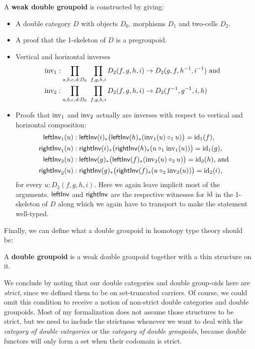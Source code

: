 \begin{defn}
A \textbf{weak double groupoid} is constructed by giving:
\begin{itemize}
\item A double category $D$ with objects $D_0$, morphisms $D_1$ and two-cells $D_2$.
\item A proof that the 1-skeleton of $D$ is a pregroupoid.
\item Vertical and horizontal inverses
\begin{align*}
\operatorname{inv_1} &: \prod_{a,b,c,d:D_0} ~ \prod_{f,g,h,i}
	D_2(f,g,h,i) \to D_2(g,f,h^{-1},i^{-1}) \text{ and } \\
\operatorname{inv_2} &: \prod_{a,b,c,d:D_0} ~ \prod_{f,g,h,i}
	D_2(f,g,h,i) \to D_2(f^{-1},g^{-1},i,h)
\end{align*}
\item Proofs that $\operatorname{inv_1}$ and $\operatorname{inv_2}$ actually are inverses with respect to
vertical and horizontal composition:
\begin{align*}
\mathsf{leftInv}_1(u) &: \mathsf{leftInv}(i)_*\big(\mathsf{leftInv}(h)_*(\operatorname{inv_1}(u) \circ_1 u)\big) =
	\operatorname{id}_1(f) \text{,} \\
\mathsf{rightInv}_1(u) &: \mathsf{rightInv}(i)_*\big(\mathsf{rightInv}(h)_*(u \circ_1 \operatorname{inv_1}(u)) \big) =
	\operatorname{id}_1(g) \text{,} \\
\mathsf{leftInv}_2(u) &: \mathsf{leftInv}(g)_*\big(\mathsf{leftInv}(f)_*(\operatorname{inv_2}(u) \circ_2 u)\big) =
	\operatorname{id}_2(h) \text{, and} \\
\mathsf{rightInv}_2(u) &: \mathsf{rightInv}(g)_*\big(\mathsf{rightInv}(f)_*(u \circ_2 \operatorname{inv_2}(u)) \big) =
	\operatorname{id}_2(i) \text{,}
\end{align*}
for every $u : D_2(f,g,h,i)$.
Here we again leave implicit most of the arguments.
$\mathsf{leftInv}$ and $\mathsf{rightInv}$ are the respective witnesses for $\operatorname{id}$ in the 1-skeleton
of $D$ along which we again have to transport to make the statement well-typed.
\end{itemize}
\end{defn}

Finally, we can define what a double groupoid in homotopy type theory should be:

\begin{defn} \label{def:dbl-gpd-hott}
A \textbf{double groupoid} is a weak double groupoid together with a thin
structure on it.
\end{defn}

We conclude by noting that our double categories and double group-oids here are
\emph{strict}, since we defined them to be on set-truncated carriers.
Of course, we could omit this condition to receive a notion of non-strict double
categories and double groupoids.
Most of my formalization does not assume those structures to be strict, but we
need to include the strictness whenever we want to deal with the \emph{category
of double categories} or the \emph{category of double groupoids}, because double
functors will only form a set when their codomain is strict.

